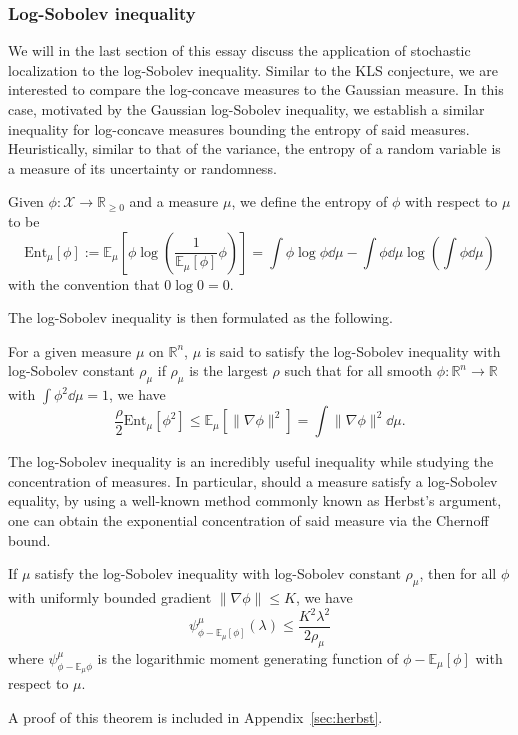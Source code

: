 \subsubsection{Log-Sobolev inequality}

We will in the last section of this essay discuss the application of stochastic localization to the 
log-Sobolev inequality. Similar to the KLS conjecture, we are interested to compare the log-concave 
measures to the Gaussian measure. In this case, motivated by the Gaussian log-Sobolev inequality, 
we establish a similar inequality for log-concave measures bounding the entropy of said measures. 
Heuristically, similar to that of the variance, the entropy of a random variable is a measure of its 
uncertainty or randomness. 

\begin{definition}[Entropy]
  Given \(\phi : \mathcal{X} \to \mathbb{R}_{\ge 0}\) and a measure \(\mu\), we define the entropy of \(\phi\) 
  with respect to \(\mu\) to be 
  \[\text{Ent}_\mu[\phi] := \mathbb{E}_\mu\left[\phi \log\left(\frac{1}{\mathbb{E}_\mu[\phi]} \phi\right)\right]
   = \int \phi \log \phi \dd \mu - \int \phi \dd \mu \log\left(\int \phi \dd \mu\right)\]
  with the convention that \(0\log 0 = 0\).
\end{definition}

The log-Sobolev inequality is then formulated as the following.
\begin{definition}
  For a given measure \(\mu\) on \(\mathbb{R}^n\), \(\mu\) is said to satisfy the log-Sobolev inequality with log-Sobolev 
  constant \(\rho_\mu\) if \(\rho_\mu\) is the largest \(\rho\) such that for all smooth 
  \(\phi : \mathbb{R}^n \to \mathbb{R}\) with \(\int \phi^2 \dd \mu = 1\), we have 
  \[\frac{\rho}{2} \text{Ent}_\mu[\phi^2] \le \mathbb{E}_\mu[\|\nabla \phi\|^2] = \int \|\nabla \phi\|^2 \dd \mu.\]
\end{definition}

The log-Sobolev inequality is an incredibly useful inequality while studying the concentration of measures. In 
particular, should a measure satisfy a log-Sobolev equality, by using a well-known method commonly known as Herbst's argument,
one can obtain the exponential concentration of said measure via the Chernoff bound. 
\begin{theorem}\label{thm:herbst}
  If \(\mu\) satisfy the log-Sobolev inequality with log-Sobolev constant \(\rho_\mu\), then for all \(\phi\) with 
  uniformly bounded gradient \(\|\nabla \phi\| \le K\), we have 
  \[\psi_{\phi - \mathbb{E}_\mu[\phi]}^\mu(\lambda) \le \frac{K^2 \lambda^2}{2\rho_\mu}\]
  where \(\psi_{\phi - \mathbb{E}_\mu \phi}^\mu\) is the logarithmic moment generating function of 
  \(\phi - \mathbb{E}_\mu[\phi]\) with respect to \(\mu\).
\end{theorem}
A proof of this theorem is included in Appendix~\ref{sec:herbst}.
  

